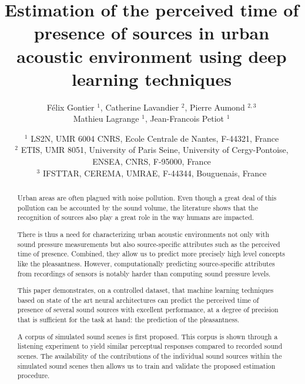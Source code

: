 \documentclass[11pt,a4paper]{article}
\begin{document}
\author{F\'elix Gontier $^1$, Catherine Lavandier $^2$, Pierre Aumond $^{2, 3}$\\Mathieu Lagrange $^1$, Jean-Francois Petiot $^1$}
\date{
$^1$ LS2N, UMR 6004 CNRS, Ecole Centrale de Nantes, F-44321, France\\
$^2$ ETIS, UMR 8051, University of Paris Seine, University of Cergy-Pontoise, ENSEA, CNRS, F-95000, France\\
$^3$ IFSTTAR, CEREMA, UMRAE, F-44344, Bouguenais, France
}
\title{Estimation of the perceived time of presence of sources in urban acoustic environment using deep learning techniques}
\maketitle


\begin{abstract}

Urban areas are often plagued with noise pollution. Even though a great deal of this pollution can be accounted by the sound volume, the literature shows that the recognition of sources also play a great role in the way humans are impacted.

There is thus a need for characterizing urban acoustic environments not only with sound pressure measurements but also source-specific attributes such as the perceived time of presence. Combined, they allow us to predict more precisely high level concepts like the pleasantness. However, computationally predicting source-specific attributes from recordings of sensors is notably harder than computing sound pressure levels.

This paper demonstrates, on a controlled dataset, that machine learning techniques based on state of the art neural architectures can predict the perceived time of presence of several sound sources with excellent performance, at a degree of precision that is sufficient for the task at hand: the prediction of the pleasantness.

A corpus of simulated sound scenes is first proposed. This corpus is shown through a listening experiment to yield similar perceptual responses compared to recorded sound scenes. The availability of the contributions of the individual sound sources within the simulated sound scenes then allows us to train and validate the proposed estimation procedure.

\end{abstract}
\end{document}
